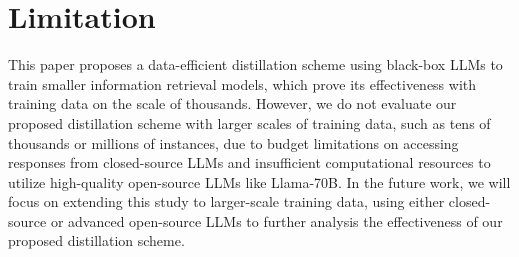 \section{Limitation}
This paper proposes a data-efficient distillation scheme using black-box LLMs to train smaller information retrieval models, which prove its effectiveness with training data on the scale of thousands. 
However, we do not evaluate our proposed distillation scheme with larger scales of training data, such as tens of thousands or millions of instances, due to budget limitations on accessing responses from closed-source LLMs and insufficient computational resources to utilize high-quality open-source LLMs like Llama-70B. 
In the future work, we will focus on extending this study to larger-scale training data, using either closed-source or advanced open-source LLMs to further analysis the effectiveness of our proposed distillation scheme.